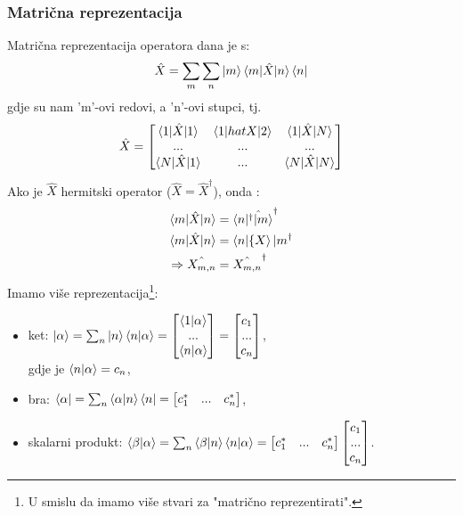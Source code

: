 \documentclass{article}
\numberwithin{equation}{section}
\begin{document}
\subsubsection{Matrična reprezentacija}
Matrična reprezentacija operatora dana je s:
\begin{equation}
	\hat{X} = \sum_m\sum_n \ket{m}\braket{m|\hat{X}|n}\bra{n}
\end{equation}
gdje su nam 'm'-ovi redovi, a 'n'-ovi stupci, tj.
\begin{equation}
	\hat{X} = 
\begin{bmatrix}
	\braket{1|\hat{X}|1} & \braket{1|hat{X}|2} & \braket{1|\hat{X}|N}\\
	... & ... & ...\\
	\braket{N|\hat{X}|1}& ...& \braket{N|\hat{X}|N}
\end{bmatrix}
\end{equation}
Ako je $\hat{X}$ hermitski operator ($\hat{X} = \hat{X}^{\dagger}$), onda :
\begin{equation}
	\begin{aligned}
		\braket{m|\hat{X}|n} &= \braket{n|\hat{^{\dagger}|m}}^{\dagger}\\
		\braket{m|\hat{X}|n} &= \braket{n|\{X}|m^{\dagger}\\
			\Rightarrow \hat{X_{m,n}} &= \hat{X_{m,n}}^{\dagger}
	\end{aligned}
\end{equation}
Imamo više reprezentacija\footnote{U smislu da imamo više stvari za "matrično reprezentirati".}:
\begin{itemize}
	\item ket: $\ket{\alpha} = \sum_n\ket{n}\braket{n|\alpha} =
				\begin{bmatrix} \braket{1|\alpha}\\ ...\\ \braket{n|\alpha} \end{bmatrix} 
				= \begin{bmatrix} c_1\\ ...\\ c_n  \end{bmatrix}$,\\
				gdje je $\braket{n|\alpha} = c_n$,
	\item bra: $\bra{\alpha} = \sum_n \braket{\alpha|n}\bra{n} = \begin{bmatrix} c_1^* & ... & c_n^* \end{bmatrix}$,
	\item skalarni produkt: $\braket{\beta|\alpha} = \sum_n \braket{\beta|n}\braket{n|\alpha}=
				\begin{bmatrix} c_1^* & ... & c_n^* \end{bmatrix} \begin{bmatrix} c_1\\ ...\\ c_n  \end{bmatrix}$.
\end{itemize}
\newpage
\end{document}
